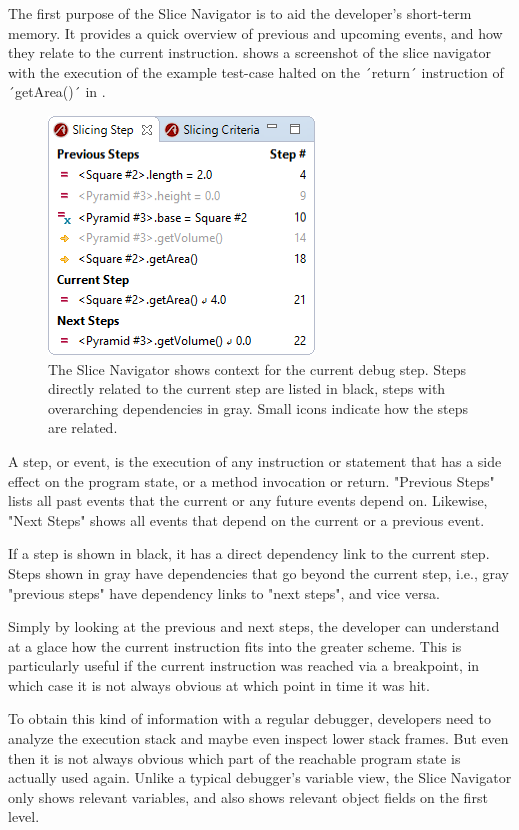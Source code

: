 \documentclass[
			english,
			]{elsarticle}
\begin{document}
The first purpose of the Slice Navigator is to aid the developer's short-term memory.
It provides a quick overview of previous and upcoming events, and how they relate to the current instruction.
 shows a screenshot of the slice navigator with the execution of the example test-case halted on the ´return´ instruction of ´getArea()´ in .

\begin{figure}
	\centering
		\includegraphics[width=0.40\linewidth]{slice1.png}
	\caption{The Slice Navigator shows context for the current debug step. Steps directly related to the current step are listed in black, steps with overarching dependencies in gray. Small icons indicate how the steps are related.}
	\label{fig:slice1}
\end{figure}

A step, or event, is the execution of any instruction or statement that has a side effect on the program state, or a method invocation or return.
"Previous Steps" lists all past events that the current or any future events depend on.
Likewise, "Next Steps" shows all events that depend on the current or a previous event.

If a step is shown in black, it has a direct dependency link to the current step.
Steps shown in gray have dependencies that go beyond the current step, i.e., gray "previous steps" have dependency links to "next steps", and vice versa.

Simply by looking at the previous and next steps, the developer can understand at a glace how the current instruction fits into the greater scheme.
This is particularly useful if the current instruction was reached via a breakpoint, in which case it is not always obvious at which point in time it was hit.

To obtain this kind of information with a regular debugger, developers need to analyze the execution stack and maybe even inspect lower stack frames.
But even then it is not always obvious which part of the reachable program state is actually used again.
Unlike a typical debugger's variable view, the Slice Navigator only shows relevant variables, and also shows relevant object fields on the first level.
\end{document}
